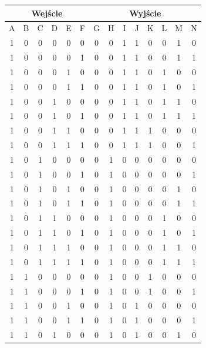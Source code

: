 \documentclass[a4paper]{article}
\begin{document}
\begin{center}
  \begin{tabular}{|c|c|c|c|c|c||c|c|c|c|c|c|c|c|}
  \hline \multicolumn{6}{|c||}{Wejście} & \multicolumn{8}{|c|}{Wyjście} \\
  \hline A & B & C & D & E & F & G   &    H & I & J & K & L & M & N \\
  \hline 1 & 0 & 0 & 0 & 0 & 0 & 0   &  	0 &	1 &	1 &	0 &	0	& 1	& 0 \\
  \hline 1 & 0 & 0 & 0 & 0 & 1 & 0   &  	0 &	1 &	1 &	0 &	0	& 1	& 1 \\
  \hline 1 & 0 & 0 & 0 & 1 & 0 & 0   &  	0 &	1 &	1 &	0 &	1	& 0	& 0 \\
  \hline 1 & 0 & 0 & 0 & 1 & 1 & 0   &  	0 &	1 &	1 &	0 &	1	& 0	& 1 \\
  \hline 1 & 0 & 0 & 1 & 0 & 0 & 0   &  	0 &	1 &	1 &	0 &	1	& 1	& 0 \\
  \hline 1 & 0 & 0 & 1 & 0 & 1 & 0   &  	0 &	1 &	1 &	0 &	1	& 1	& 1 \\
  \hline 1 & 0 & 0 & 1 & 1 & 0 & 0   &  	0 &	1 &	1 &	1 &	0	& 0	& 0 \\
  \hline 1 & 0 & 0 & 1 & 1 & 1 & 0   &  	0 &	1 &	1 &	1 &	0	& 0	& 1 \\
  \hline 1 & 0 & 1 & 0 & 0 & 0 & 0   &  	1 &	0 &	0 &	0 &	0	& 0	& 0 \\
  \hline 1 & 0 & 1 & 0 & 0 & 1 & 0   &  	1 &	0 &	0 &	0 &	0	& 0	& 1 \\
  \hline 1 & 0 & 1 & 0 & 1 & 0 & 0   &  	1 &	0 &	0 &	0 &	0	& 1	& 0 \\
  \hline 1 & 0 & 1 & 0 & 1 & 1 & 0   &  	1 &	0 &	0 &	0 &	0	& 1	& 1 \\
  \hline 1 & 0 & 1 & 1 & 0 & 0 & 0   &  	1 &	0 &	0 &	0 &	1	& 0	& 0 \\
  \hline 1 & 0 & 1 & 1 & 0 & 1 & 0   &  	1 &	0 &	0 &	0 &	1	& 0	& 1 \\
  \hline 1 & 0 & 1 & 1 & 1 & 0 & 0   &  	1 &	0 &	0 &	0 &	1	& 1	& 0 \\
  \hline 1 & 0 & 1 & 1 & 1 & 1 & 0   &  	1 &	0 &	0 &	0 &	1	& 1	& 1 \\
  \hline 1 & 1 & 0 & 0 & 0 & 0 & 0   &  	1 &	0 &	0 &	1 &	0	& 0	& 0 \\
  \hline 1 & 1 & 0 & 0 & 0 & 1 & 0   &  	1 &	0 &	0 &	1 &	0	& 0	& 1 \\
  \hline 1 & 1 & 0 & 0 & 1 & 0 & 0   &  	1 &	0 &	1 &	0 &	0	& 0	& 0 \\
  \hline 1 & 1 & 0 & 0 & 1 & 1 & 0   &  	1 &	0 &	1 &	0 &	0	& 0	& 1 \\
  \hline 1 & 1 & 0 & 1 & 0 & 0 & 0   &  	1 &	0 &	1 &	0 &	0	& 1	& 0 \\

\end{tabular}
\end{center}
\end{document}

